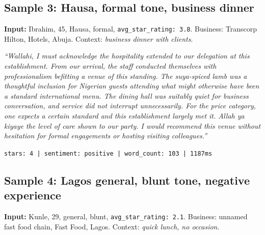 \documentclass[11pt]{article}
\begin{document}

\subsection*{Sample 3: Hausa, formal tone, business dinner}

\noindent\textbf{Input:} Ibrahim, 45, Hausa, formal, \texttt{avg\_star\_rating: 3.8}. Business: Transcorp Hilton, Hotels, Abuja. Context: \textit{business dinner with clients}.

\smallskip
{\small\itshape ``Wallahi, I must acknowledge the hospitality extended to our delegation at this establishment. From our arrival, the staff conducted themselves with professionalism befitting a venue of this standing. The suya-spiced lamb was a thoughtful inclusion for Nigerian guests attending what might otherwise have been a standard international menu. The dining hall was suitably quiet for business conversation, and service did not interrupt unnecessarily. For the price category, one expects a certain standard and this establishment largely met it. Allah ya kiyaye the level of care shown to our party. I would recommend this venue without hesitation for formal engagements or hosting visiting colleagues.''}

\smallskip\noindent\texttt{stars: 4 | sentiment: positive | word\_count: 103 | 1187ms}


\subsection*{Sample 4: Lagos general, blunt tone, negative experience}

\noindent\textbf{Input:} Kunle, 29, general, blunt, \texttt{avg\_star\_rating: 2.1}. Business: unnamed fast food chain, Fast Food, Lagos. Context: \textit{quick lunch, no occasion}.
\end{document}

